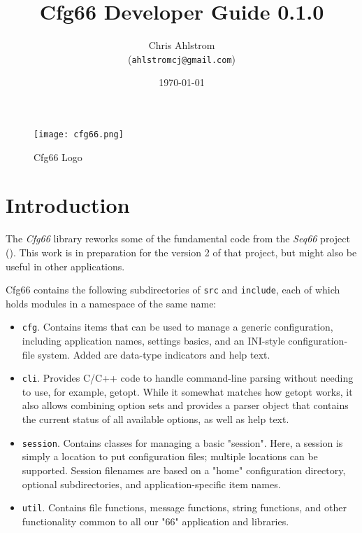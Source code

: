 \documentclass[
 11pt,
 twoside,
 a4paper,
 final                                 %
]{article}
\begin{document}
\title{Cfg66 Developer Guide 0.1.0}
\author{Chris Ahlstrom \\
   (\texttt{ahlstromcj@gmail.com})}
\date{\today}
\maketitle

\begin{figure}[H]
   \centering 
   \texttt{[image: cfg66.png]}
   \caption*{Cfg66 Logo}
\end{figure}

\clearpage                             %

\tableofcontents
\listoffigures                         %

%

\parindent 0pt
\parskip 9pt

\rhead{\rightmark}         %

\section{Introduction}
\label{sec:introduction}

   The \textsl{Cfg66} library reworks some of the fundamental code
   from the \textsl{Seq66} project (\cite{seq66}).
   This work is in preparation for the version 2 of that project, but
   might also be useful in other applications.

   Cfg66 contains the following subdirectories of \texttt{src} and
   \texttt{include}, each of which holds modules in a
   namespace of the same name:

   \begin{itemize}
      \item \texttt{cfg}.
         Contains items that can be used to manage a generic
         configuration, including application names, settings basics,
         and an INI-style configuration-file system. Added are
         data-type indicators and help text.
      \item \texttt{cli}.
         Provides C/C++ code to handle command-line parsing without
         needing to use, for example, getopt. While it somewhat matches
         how getopt works, it also allows combining option sets and
         provides a parser object that contains the current status
         of all available options, as well as help text.
      \item \texttt{session}.
         Contains classes for managing a basic "session". Here, a
         session is simply a location to put configuration files;
         multiple locations can be supported. Session filenames are
         based on a "home" configuration directory, optional
         subdirectories, and application-specific item names.
      \item \texttt{util}.
         Contains file functions, message functions, string functions,
         and other functionality common to all our "66" application
         and libraries.
   \end{itemize}
\end{document}
